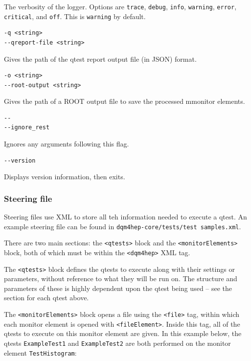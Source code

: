The verbosity of the logger. Options are \texttt{trace}, \texttt{debug}, \texttt{info}, \texttt{warning}, \texttt{error}, \texttt{critical}, and \texttt{off}. This is \texttt{warning} by default.

\begin{lstlisting}
-q <string>
--qreport-file <string>
\end{lstlisting}

Gives the path of the \acrshort{qtest} report output file (in \acrshort{JSON}) format.

\begin{lstlisting}
-o <string>
--root-output <string>
\end{lstlisting}

Gives the path of a ROOT output file to save the processed mmonitor elements.

\begin{lstlisting}
--
--ignore_rest
\end{lstlisting}

Ignores any arguments following this flag.

\begin{lstlisting}
--version
\end{lstlisting}

Displays version information, then exits.

\subsubsection{Steering file}
Steering files use \acrshort{XML} to store all teh information needed to execute a \acrshort{qtest}. An example steering file can be found in \texttt{dqm4hep-core/tests/test \textunderscore samples.xml}.

There are two main sections: the \texttt{<qtests>} block and the \texttt{<monitorElements>} block, both of which must be within the \texttt{<dqm4hep>} XML tag.

The \texttt{<qtests>} block defines the \acrshort{qtest}s to execute along with their settings or parameters, without reference to what they will be run on. The structure and parameters of these is highly dependent upon the \acrshort{qtest} being used – see the section for each \acrshort{qtest} above.

The \texttt{<monitorElements>} block opens a file using the \texttt{<file>} tag, within which each monitor element is opened with \texttt{<fileElement>}. Inside this tag, all of the \acrshort{qtest}s to execute on this monitor element are given. In this example below, the \acrshort{qtest}s \texttt{ExampleTest1} and \texttt{ExampleTest2} are both performed on the monitor element \texttt{TestHistogram}:

